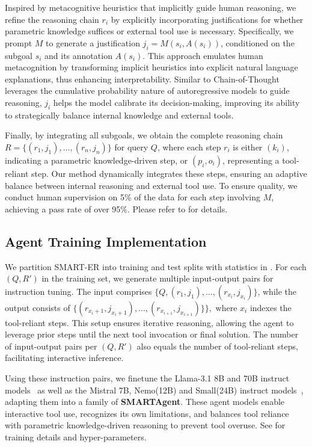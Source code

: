 Inspired by metacognitive heuristics that implicitly guide human reasoning, we refine the reasoning chain \( r_i \) by explicitly incorporating justifications for whether parametric knowledge suffices or external tool use is necessary.
Specifically, we prompt \( M \) to generate a justification \( j_i = M(s_i, A(s_i)) \), conditioned on the subgoal \( s_i \) and its annotation \( A(s_i) \). This approach emulates human metacognition by transforming implicit heuristics into explicit natural language explanations, thus enhancing interpretability. Similar to Chain-of-Thought~\citep{wei2022chain} leverages the cumulative probability nature of autoregressive models to guide reasoning, \( j_i \) helps the model calibrate its decision-making, improving its ability to strategically balance internal knowledge and external tools.

Finally, by integrating all subgoals, we obtain the complete reasoning chain \( R = \{(r_1, j_1), \dots, (r_n, j_n)\} \) for query \( Q \), where each step \( r_i \) is either \( (k_i) \), indicating a parametric knowledge-driven step, or \( (p_i, o_i) \), representing a tool-reliant step. Our method dynamically integrates these steps, ensuring an adaptive balance between internal reasoning and external tool use. To ensure quality, we conduct human supervision on 5\% of the data for each step involving \( M \), achieving a pass rate of over 95\%. Please refer to  for details.

\subsection{Agent Training Implementation}
We partition SMART-ER into training and test splits with statistics in . For each \((Q, R')\) in the training set, we generate multiple input-output pairs for instruction tuning. The input comprises \(\{Q, (r_1, j_1), \dots, (r_{x_i}, j_{x_i})\}\), while the output consists of \(\{(r_{{x_i}+1}, j_{{x_i}+1}), \dots, (r_{x_{i+1}}, j_{x_{i+1}})\}\},\) where \( x_i \) indexes the tool-reliant steps. This setup ensures iterative reasoning, allowing the agent to leverage prior steps until the next tool invocation or final solution. The number of input-output pairs per \((Q, R')\) also equals the number of tool-reliant steps, facilitating interactive inference.

Using these instruction pairs, we finetune the Llama-3.1 8B and 70B instruct models~\citep{dubey2024llama} as well as the Mistral 7B, Nemo(12B) and Small(24B) instruct models~\citep{jiang2023mistral}, adapting them into a family of \textbf{SMARTAgent}. These agent models enable interactive tool use, recognizes its own limitations, and balances tool reliance with parametric knowledge-driven reasoning to prevent tool overuse. See  for training details and hyper-parameters.
